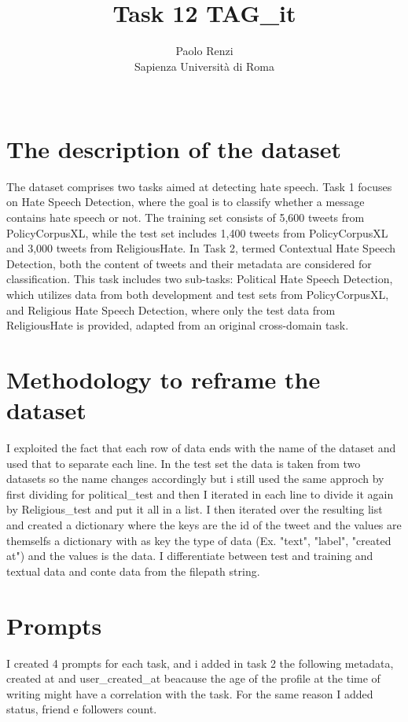 \documentclass[11pt]{article}
\title{Task 12 TAG\_it}
\author{Paolo Renzi \\
  Sapienza Università di Roma\\\
  }
\begin{document}
\maketitle

\section{The description of the dataset}

The dataset comprises two tasks aimed at detecting hate speech. Task 1 focuses on Hate Speech Detection, 
where the goal is to classify whether a message contains hate speech or not. The training set consists of 5,600 tweets 
from PolicyCorpusXL, while the test set includes 1,400 tweets from PolicyCorpusXL and 3,000 tweets from ReligiousHate. 
In Task 2, termed Contextual Hate Speech Detection, both the content of tweets and their metadata are considered 
for classification. This task includes two sub-tasks: Political Hate Speech Detection, which utilizes data from both 
development and test sets from PolicyCorpusXL, and Religious Hate Speech Detection, where only the test data 
from ReligiousHate is provided, adapted from an original cross-domain task.


\section{Methodology to reframe the dataset}

I exploited the fact that each row of data ends with the name of the dataset and used that to separate each line. 
In the test set the data is taken from two datasets so the name changes accordingly but i still used the same approch 
by first dividing for political\_test and then I iterated in each line to divide it again by Religious\_test and put it all 
in a list. I then iterated over the resulting list and created a dictionary where the keys are the id of the tweet and 
the values are themselfs a dictionary with as key the type of data (Ex. "text", "label", "created at") and the values is 
the data. I differentiate between test and training and textual data and conte data from the filepath string.

\section{Prompts}

I created 4 prompts for each task, and i added in task 2 the following metadata, created at and user\_created\_at beacause the 
age of the profile at the time of writing might have a correlation with the task. For the same reason I added status, friend
e followers count.
\end{document}
